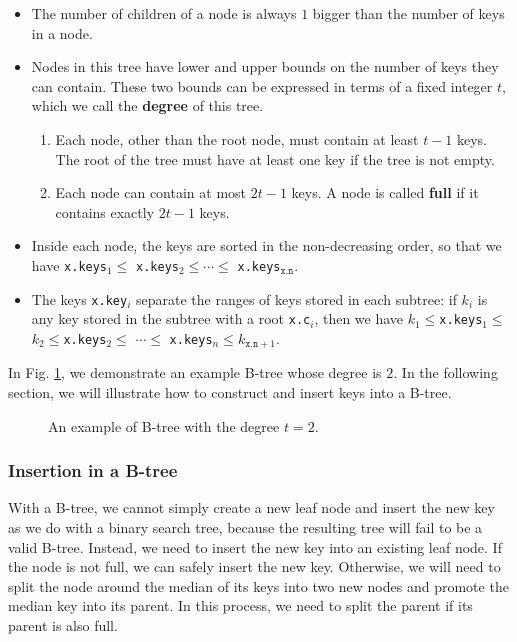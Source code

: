 \begin{itemize}
\item The number of children of a node is always $1$ bigger than the number of keys in a node.
\item Nodes in this tree have lower and upper bounds on the number of keys they can contain. These two bounds can be expressed in terms of a fixed integer $t$, which we call the \textbf{degree} of this tree.
	\begin{enumerate}
		\item Each node, other than the root node, must contain at least $t-1$ keys. The root of the tree must have at least one key if the tree is not empty.
		\item Each node can contain at most $2t-1$ keys. A node is called \textbf{full} if it contains exactly $2t-1$ keys.
	\end{enumerate}
\item Inside each node, the keys are sorted in the non-decreasing order, so that we have \texttt{x.keys$_1\leq $} \texttt{x.keys$_2\leq \cdots \leq$} \texttt{x.keys$_{\texttt{x.n}}$}.
\item The keys \texttt{x.key$_i$} separate the ranges of keys stored in each subtree: if $k_i$ is any key stored in the subtree with a root \texttt{x.c$_i$}, then we have $k_1\leq$\texttt{x.keys$_1\leq $}$ k_2\leq$\texttt{x.keys$_2\leq $} $\cdots\leq$ \texttt{x.keys$_n\leq $}$k_{\texttt{x.n}+1}$.
\end{itemize}

In Fig. \ref{fig: B-tree}, we demonstrate an example B-tree whose degree is $2$. In the following section, we will illustrate how to construct and insert keys into a B-tree.

\begin{figure}
\centering

\caption{An example of B-tree with the degree $t=2$.}
\label{fig: B-tree}
\end{figure}

\subsubsection{Insertion in a B-tree}

With a B-tree, we cannot simply create a new leaf node and insert the new key as we do with a binary search tree, because the resulting tree will fail to be a valid B-tree. Instead, we need to insert the new key into an existing leaf node. If the node is not full, we can safely insert the new key. Otherwise, we will need to split the node around the median of its keys into two new nodes and promote the median key into its parent. In this process, we need to split the parent if its parent is also full.

